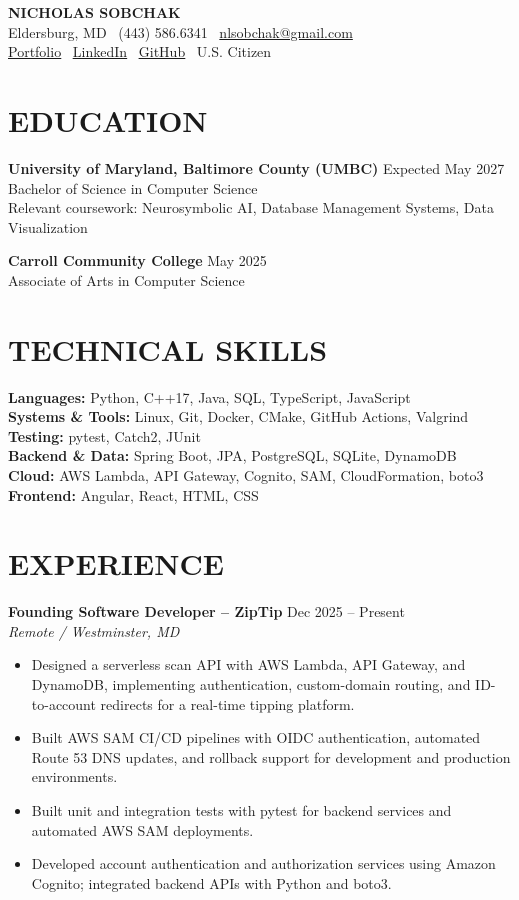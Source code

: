 \documentclass[10pt,letterpaper]{article}
\begin{document}
{\LARGE \textbf{\color{accent} NICHOLAS SOBCHAK}}\\
Eldersburg, MD \textbar\ (443) 586.6341 \textbar\ \href{mailto:nlsobchak@gmail.com}{nlsobchak@gmail.com}\\
\underline{\href{https://nickczak.github.io/portfolio/}{Portfolio}} \textbar\
\underline{\href{https://linkedin.com/in/nicholas-sobchak-b4aa2a329}{LinkedIn}} \textbar\
\underline{\href{https://github.com/nickczak}{GitHub}} \textbar\ U.S. Citizen

\section*{EDUCATION}
\textbf{University of Maryland, Baltimore County (UMBC)} \hfill Expected May 2027\\
Bachelor of Science in Computer Science\\
Relevant coursework: Neurosymbolic AI, Database Management Systems, Data Visualization

\textbf{Carroll Community College} \hfill May 2025\\
Associate of Arts in Computer Science

\section*{TECHNICAL SKILLS}
\textbf{Languages:} Python, C++17, Java, SQL, TypeScript, JavaScript \\
\textbf{Systems \& Tools:} Linux, Git, Docker, CMake, GitHub Actions, Valgrind \\
\textbf{Testing:} pytest, Catch2, JUnit \\
\textbf{Backend \& Data:} Spring Boot, JPA, PostgreSQL, SQLite, DynamoDB \\
\textbf{Cloud:} AWS Lambda, API Gateway, Cognito, SAM, CloudFormation, boto3 \\
\textbf{Frontend:} Angular, React, HTML, CSS

\section*{EXPERIENCE}
\textbf{Founding Software Developer -- ZipTip} \hfill Dec 2025 -- Present\\
\textit{Remote / Westminster, MD}
\begin{itemize}
  \item Designed a serverless scan API with AWS Lambda, API Gateway, and DynamoDB, implementing authentication, custom-domain routing, and ID-to-account redirects for a real-time tipping platform.
  \item Built AWS SAM CI/CD pipelines with OIDC authentication, automated Route 53 DNS updates, and rollback support for development and production environments.
  \item Built unit and integration tests with pytest for backend services and automated AWS SAM deployments.
  \item Developed account authentication and authorization services using Amazon Cognito; integrated backend APIs with Python and boto3.
\end{itemize}
\end{document}
